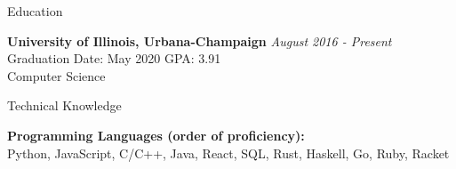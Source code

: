 \documentclass{resume} %
\begin{document}

    \begin{rSection}{Education}

{\bf University of Illinois, Urbana-Champaign} \hfill {\em August 2016 - Present} 
\\ Graduation Date: May 2020 \hfill { GPA: 3.91}
\\ Computer Science


        \end{rSection}

        \begin{rSection}{Technical Knowledge}

            \textbf{Programming Languages (order of proficiency):}\\  Python, JavaScript, C/C++, Java, React, SQL, Rust, Haskell, Go, Ruby, Racket

            \end{rSection}

\end{document}

